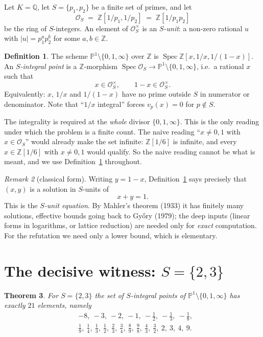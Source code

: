 \documentclass[11pt]{article}
\newtheorem{theorem}{Theorem}
\theoremstyle{definition}
\newtheorem{definition}[theorem]{Definition}
\theoremstyle{remark}
\newtheorem{remark}[theorem]{Remark}
\newcommand{\Z}{\mathbb{Z}}
\newcommand{\Q}{\mathbb{Q}}
\newcommand{\PP}{\mathbb{P}}
\newcommand{\OK}{\mathcal{O}}
\begin{document}
Let $K=\Q$, let $S=\{p_1,p_2\}$ be a finite set of primes, and let
\[
\OK_S \;=\; \Z[1/p_1,1/p_2] \;=\; \Z[1/p_1 p_2]
\]
be the ring of $S$-integers. An element of $\OK_S^\times$ is an \emph{$S$-unit}:
a non-zero rational $u$ with $|u|=p_1^{a}p_2^{b}$ for some $a,b\in\Z$.

\begin{definition}\label{def:sint}
The scheme $\PP^1\setminus\{0,1,\infty\}$ over $\Z$ is
$\operatorname{Spec}\Z[x,1/x,1/(1-x)]$. An \emph{$S$-integral point} is a
$\Z$-morphism $\operatorname{Spec}\OK_S\to\PP^1\setminus\{0,1,\infty\}$, i.e.\
a rational $x$ such that
\[
x \in \OK_S^\times, \qquad 1-x \in \OK_S^\times .
\]
Equivalently: $x$, $1/x$ and $1/(1-x)$ have no prime outside $S$ in numerator
or denominator. Note that ``$1/x$ integral'' forces $v_p(x)=0$ for
$p\notin S$.
\end{definition}

The integrality is required at the \emph{whole} divisor $\{0,1,\infty\}$. This
is the only reading under which the problem is a finite count. The naive
reading ``$x\ne 0,1$ with $x\in\OK_S$'' would already make the set infinite:
$\Z[1/6]$ is infinite, and every $x\in\Z[1/6]$ with $x\ne 0,1$ would qualify. So
the naive reading cannot be what is meant, and we use Definition~\ref{def:sint}
throughout.

\begin{remark}[classical form]
Writing $y=1-x$, Definition~\ref{def:sint} says precisely that $(x,y)$ is a
solution in $S$-units of
\[
x+y=1 .
\]
This is the \emph{$S$-unit equation}. By Mahler's theorem (1933) it has
finitely many solutions, effective bounds going back to Gy\H{o}ry (1979); the
deep inputs (linear forms in logarithms, or lattice reduction) are needed only
for \emph{exact} computation. For the refutation we need only a lower bound,
which is elementary.
\end{remark}

\section{The decisive witness: $S=\{2,3\}$}

\begin{theorem}\label{thm:21}
For $S=\{2,3\}$ the set of $S$-integral points of
$\PP^1\setminus\{0,1,\infty\}$ has exactly $21$ elements, namely
\[
\begin{aligned}
&-8,\ -3,\ -2,\ -1,\ -\tfrac12,\ -\tfrac13,\ -\tfrac18,\\
&\tfrac19,\ \tfrac14,\ \tfrac13,\ \tfrac12,\ \tfrac23,\ \tfrac34,\
 \tfrac89,\ \tfrac98,\ \tfrac43,\ \tfrac32,\ 2,\ 3,\ 4,\ 9 .
\end{aligned}
\]
\end{theorem}
\end{document}
